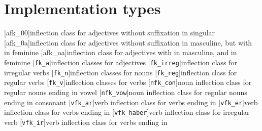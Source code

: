 \chapter*{Implementation types}


\begin{multicols}{2}
\setlength{\columnseprule}{.5pt}
\begin{acronym}[VFKhaber]
	[afk\_00]{inflection class for adjectives without suffixation in singular}
	[afk\_0a]{inflection class for adjectives without suffixation in masculine, but with  in feminine}
	[afk\_oa]{inflection class for adjectives with  in masculine, and  in feminine}
%
	[\texttt{fk\_a}]{inflection classes for adjectives}	
	[\texttt{fk\_irreg}]{inflection class for irregular verbs}
	[\texttt{fk\_n}]{inflection classes for nouns}
	[\texttt{fk\_reg}]{inflection class for regular verbs}
	[\texttt{fk\_v}]{inflection classes for verbs}
%
	[\texttt{nfk\_con}]{noun inflection class for regular nouns ending in vowel}
	[\texttt{nfk\_vow}]{noun inflection class for regular nouns ending in consonant}	
%
	[\texttt{vfk\_ar}]{verb inflection class for verbs ending in }
	[\texttt{vfk\_er}]{verb inflection class for verbs ending in }
	[\texttt{vfk\_haber}]{verb inflection class for irregular verb }	
	[\texttt{vfk\_ir}]{verb inflection class for verbs ending in }		
%
%	
\end{acronym}
\end{multicols}